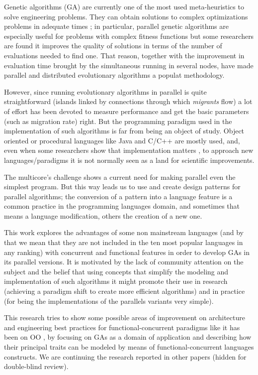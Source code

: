 
\noindent Genetic algorithms (GA) \cite{GA_Goldberg89} are currently one of the most used
meta-heuristics to solve engineering problems. They can obtain
solutions to complex optimizations problems in adequate times
\cite{Luque2011}; in particular, parallel genetic algorithms are
especially useful for problems with complex fitness functions but some
researchers are found \cite{Alba2001} it improves the quality of
solutions in terms of the number of evaluations needed to find
one. That reason, together with the improvement in evaluation time
brought by the simultaneous running in several nodes, have made
parallel and distributed evolutionary algorithms a populat
methodology. 

However, since running evolutionary algorithms in parallel is quite
straightforward (islands linked by connections through which {\em
  migrants} flow) a lot of effort has been devoted to measure
performance and get the basic parameters (such as migration rate)
right. But the programming paradigm used in the implementation of such
algorithms is far from being an object of study. Object oriented or
procedural languages like
Java and C/C++ are mostly used, and, even when some researchers show
that implementation matters \cite{DBLP:conf/iwann/MereloRACML11}, to
approach new languages/paradigms it is not normally seen as a land for
scientific improvements. 

The multicore’s challenge \cite{SutterL05} shows a current need for
making parallel even the simplest program. But this way leads us to
use and create design patterns for parallel algorithms; the conversion
of a pattern into a language feature is a common practice in the
programming languages domain, and sometimes that means a language
modification, others the creation of a new one. 

This work explores the advantages of some non mainstream languages
(and by that we mean that they are not included in the ten most
popular languages in any ranking) with concurrent and functional
features in order to develop GAs in its parallel versions. It is
motivated by the lack of community attention on the subject and the
belief that using concepts that simplify the modeling and
implementation of such algorithms it might promote their use in
research (achieving a paradigm shift to create more efficient
algorithms) and in practice (for being the implementations of the
parallels variants very simple). 

This research tries to show some possible areas of improvement on
architecture and engineering best practices for functional-concurrent
paradigms like it has been on OO \cite{EO:FEA2000}, by focusing on GAs
as a domain of application and describing how their principal traits
can be modeled by means of functional-concurrent languages
constructs. We are continuing the research reported in
other papers (hidden for double-blind review).

